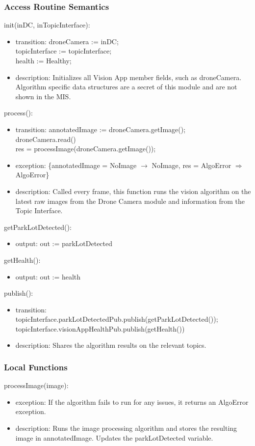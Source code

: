 \documentclass[12pt, titlepage]{article}
\begin{document}
\subsubsection{Access Routine Semantics}
\noindent init(inDC, inTopicInterface):
\begin{itemize}
\item transition:  droneCamera := inDC; \\  topicInterface := topicInterface; \\ health := Healthy;
\item description: Initializes all Vision App member fields, such as droneCamera. Algorithm specific data structures are a secret of this module and are not shown in the MIS.
\end{itemize}
\noindent process():
\begin{itemize}
\item transition: annotatedImage := droneCamera.getImage(); \\
droneCamera.read()\\
res = processImage(droneCamera.getImage()); 
\item exception: \{annotatedImage = NoImage $\rightarrow$ NoImage, res = AlgoError $\Rightarrow$ AlgoError\} \\
\item description: Called every frame, this function runs the vision algorithm on the latest raw images from the Drone Camera module and information from the Topic Interface. 
\end{itemize}
\noindent getParkLotDetected():
\begin{itemize}
\item output: out := parkLotDetected 
\end{itemize}
\noindent getHealth():
\begin{itemize}
\item output: out := health 
\end{itemize}
\noindent publish():
\begin{itemize}
\item transition: topicInterface.parkLotDetectedPub.publish(getParkLotDetected()); \\ topicInterface.visionAppHealthPub.publish(getHealth())
\item description: Shares the algorithm results on the relevant topics.
\end{itemize}
\subsubsection{Local Functions}
\noindent processImage(image):
\begin{itemize}
\item exception: If the algorithm fails to run for any issues, it returns an AlgoError exception. 
\item description: Runs the image processing algorithm and stores the resulting image in annotatedImage. Updates the parkLotDetected variable.  
\end{itemize}
\newpage
\end{document}
